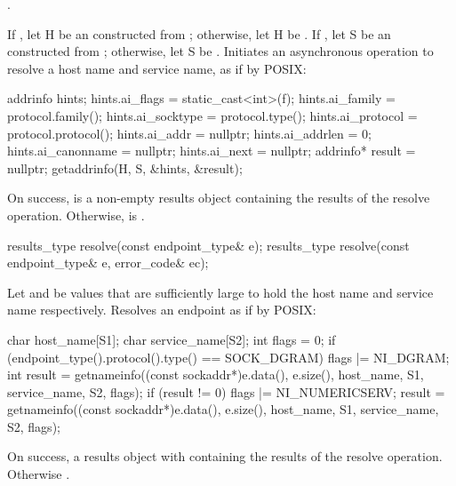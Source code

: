 \begin{itemdescr}
\pnum
\completionsig {}.

\pnum
\effects If , let H be an \ntbs constructed from ; otherwise, let H be . If , let S be an \ntbs constructed from ; otherwise, let S be . Initiates an asynchronous operation to resolve a host name and service name, as if by POSIX:
\begin{codeblock}
addrinfo hints;
hints.ai_flags = static_cast<int>(f);
hints.ai_family = protocol.family();
hints.ai_socktype = protocol.type();
hints.ai_protocol = protocol.protocol();
hints.ai_addr = nullptr;
hints.ai_addrlen = 0;
hints.ai_canonname = nullptr;
hints.ai_next = nullptr;
addrinfo* result = nullptr;
getaddrinfo(H, S, &hints, &result);
\end{codeblock}
 On success,  is a non-empty results object containing the results of the resolve operation. Otherwise,  is .
\end{itemdescr}

\begin{itemdecl}
results_type resolve(const endpoint_type& e);
results_type resolve(const endpoint_type& e, error_code& ec);
\end{itemdecl}

\begin{itemdescr}
\pnum
\effects Let  and  be  values that are sufficiently large to hold the host name and service name respectively. Resolves an endpoint as if by POSIX:
\begin{codeblock}
char host_name[S1];
char service_name[S2];
int flags = 0;
if (endpoint_type().protocol().type() == SOCK_DGRAM)
  flags |= NI_DGRAM;
int result = getnameinfo((const sockaddr*)e.data(), e.size(),
                         host_name, S1,
                         service_name, S2,
                         flags);
if (result != 0)
{
  flags |= NI_NUMERICSERV;
  result = getnameinfo((const sockaddr*)e.data(), e.size(),
                       host_name, S1,
                       service_name, S2,
                       flags);
}
\end{codeblock}


\pnum
\returns On success, a results object with  containing the results of the resolve operation. Otherwise .
\end{itemdescr}

